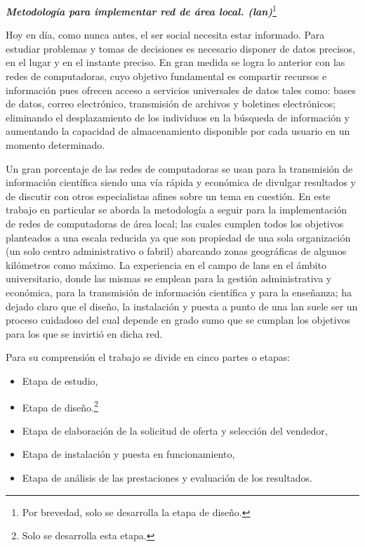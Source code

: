
\textbf{\emph{Metodología para implementar red de área local. (\gls{lan}\@)}}\footnote{Por brevedad, solo se desarrolla la etapa de diseño.}

\vspace{.3 cm}

Hoy en día, como nunca antes, el ser social necesita estar informado. Para estudiar problemas y tomas de decisiones es necesario disponer de datos precisos, en el lugar y en el instante preciso. En gran medida se logra lo anterior con las redes de computadoras, cuyo objetivo fundamental es compartir recursos e información pues ofrecen acceso a servicios universales de datos tales como: bases de datos, correo electrónico, transmisión de archivos y boletines electrónicos; eliminando el desplazamiento de los individuos en la búsqueda de información y aumentando la capacidad de almacenamiento disponible por cada usuario en un momento determinado.

Un gran porcentaje de las redes de computadoras se usan para la transmisión de información científica siendo una vía rápida y económica de divulgar resultados y de discutir con otros especialistas afines sobre un tema en cuestión. En este trabajo en particular se aborda la metodología a seguir para la implementación de redes de computadoras de área local; las cuales cumplen todos los objetivos planteados a una escala reducida ya que son propiedad de una sola organización (un solo centro administrativo o fabril) abarcando zonas geográficas de algunos kilómetros como máximo. La experiencia en el campo de \glspl{lan} en el ámbito universitario, donde las mismas se emplean para la gestión administrativa y económica, para la transmisión de información científica y para la enseñanza; ha dejado claro que el diseño, la instalación y puesta a punto de una \gls{lan} suele ser un proceso cuidadoso del cual depende en grado sumo que se cumplan los objetivos para los que se invirtió en dicha red.

Para su comprensión el trabajo se divide en cinco partes o etapas:
\begin{itemize}
\item Etapa de estudio,
\item Etapa de diseño.\footnote{Solo se desarrolla esta etapa.}
\item Etapa de elaboración de la solicitud de oferta y selección del vendedor,
\item Etapa de instalación y puesta en funcionamiento,
\item Etapa de análisis de las prestaciones y evaluación de los resultados.
\end{itemize}
 
